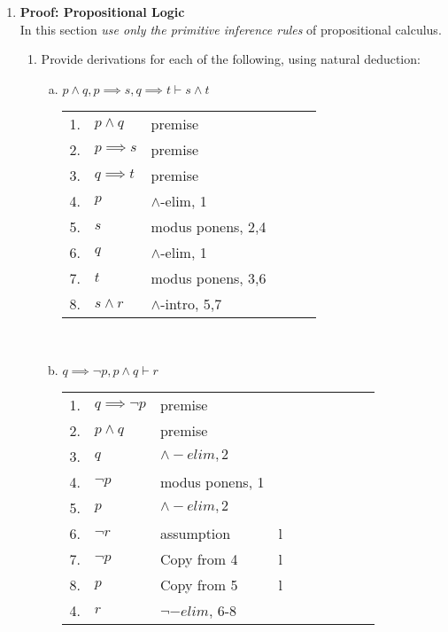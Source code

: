 \documentclass{article}
\begin{document}
\begin{enumerate}[\bf I.]
\item \textbf{Proof: Propositional Logic} \\[6pt]
In this section {\em use only the primitive inference rules} of
propositional calculus.
\begin{enumerate}[1.] \setcounter{enumii}{0}
\item Provide derivations for each of the following, using natural
deduction:
\begin{enumerate}[a.]
 \item $p \land q,p\implies s,q\implies t\vdash s\land t$ \\
   \begin{tabular}{l ll lll}
     1. & $p \land q$ & premise \\
     2. & $p \implies s$ & premise \\
     3. & $q \implies t$ & premise \\
     4. & $p$            & $\land$-elim, 1 \\
     5. & $s$            & modus ponens, 2,4 \\
     6. & $q$            & $\land$-elim, 1 \\
     7. & $t$            & modus ponens, 3,6 \\
     8. & $s\land r$     & $\land$-intro, 5,7 \\
   \end{tabular} \\
 \item $q \implies \neg p,p\land q\vdash r$ \\
   \begin{tabular}{l ll lll llll}
     1. & $q \implies \neg p$ & premise \\
     2. & $p \land q$         & premise \\
     3. & $q$                 & $\land -elim, 2$ \\
     4. & $\neg p$            & modus ponens, 1 \\  
     5. & $p$                 & $\land -elim, 2$ \\
     6.	& $\neg r$            & assumption  & l\\ 
     7. & $\neg p$            & Copy from 4 & l\\
     8. & $p$                 & Copy from 5 & l\\
     4. & $r$                 & $\neg -elim$, 6-8 \\

\end{tabular}
\end{enumerate}
\end{enumerate}
\end{enumerate}
\end{document}
